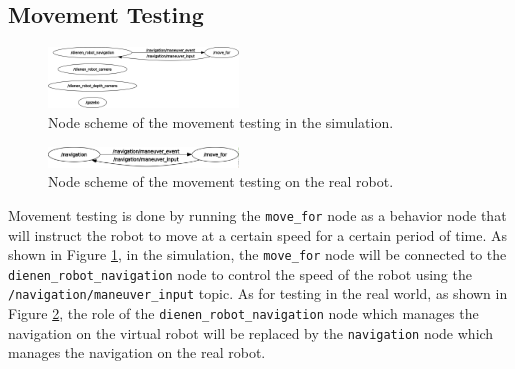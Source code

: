 \subsection{Movement Testing}
\label{subsec:movementtesting}

\begin{figure} [ht]
  \centering
  \includegraphics[width=0.45\textwidth]{images/rosgraph-simulation-movement-test.png}
  \caption{Node scheme of the movement testing in the simulation.}
  \label{fig:rosgraphsimulationmovementtest}
\end{figure}

\begin{figure} [ht]
  \centering
  \includegraphics[width=0.45\textwidth]{images/rosgraph-real-robot-movement-test.png}
  \caption{Node scheme of the movement testing on the real robot.}
  \label{fig:rosgraphrealrobotmovementtest}
\end{figure}

Movement testing is done by running the \lstinline{move_for} node as a behavior node that will instruct the robot to move at a certain speed for a certain period of time.
As shown in Figure \ref{fig:rosgraphsimulationmovementtest}, in the simulation,
  the \lstinline{move_for} node will be connected to the \lstinline{dienen_robot_navigation} node to control the speed of the robot using the \lstinline{/navigation/maneuver_input} topic.
As for testing in the real world, as shown in Figure \ref{fig:rosgraphrealrobotmovementtest}, the role of the \lstinline{dienen_robot_navigation} node which manages the navigation on the virtual robot will be replaced by the \lstinline{navigation} node which manages the navigation on the real robot.

